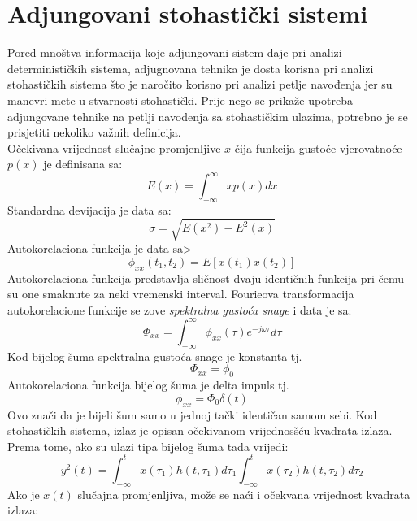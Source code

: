 \section{Adjungovani stohastički sistemi}
Pored mnoštva informacija koje adjungovani sistem daje pri analizi determinističkih 
sistema, adjugnovana tehnika je dosta korisna pri analizi stohastičkih sistema što je 
naročito korisno pri analizi petlje navođenja jer su manevri mete u stvarnosti stohastički. 
Prije nego se prikaže upotreba adjungovane tehnike na petlji navođenja sa stohastičkim 
ulazima, potrebno je se prisjetiti nekoliko važnih definicija.\\
Očekivana vrijednost slučajne promjenljive $x$ čija funkcija gustoće vjerovatnoće $p(x)$ je definisana sa:
\begin{equation}
    E(x)=\int_{-\infty}^{\infty}xp(x)dx
\end{equation}
Standardna devijacija je data sa:
\begin{equation}
    \sigma = \sqrt{E(x^2)-E^2(x)}
\end{equation}
Autokorelaciona funkcija je data sa>
\begin{equation}
    \phi_{xx}(t_1,t_2)=E[x(t_1)x(t_2)]
\end{equation}
Autokorelaciona funkcija predstavlja sličnost dvaju identičnih funkcija 
pri čemu su one smaknute za neki vremenski interval.
Fourieova transformacija autokorelacione funkcije se zove \textit{spektralna 
gustoća snage} i data je sa:
\begin{equation}
    \Phi_{xx}=\int_{-\infty}^{\infty}\phi_{xx}(\tau)e^{-j\omega\tau}d\tau
\end{equation}
Kod bijelog šuma spektralna gustoća snage je konstanta tj.
\begin{equation}
    \Phi_{xx}=\phi_{0}
\end{equation}
Autokorelaciona funkcija bijelog šuma je delta impuls tj. 
\begin{equation}
    \phi_{xx}=\Phi_{0}\delta(t)
\end{equation}
Ovo znači da je bijeli šum samo u jednoj tački identičan samom sebi. 
Kod stohastičkih sistema, izlaz je opisan očekivanom vrijednosšću kvadrata izlaza. 
Prema tome, ako su ulazi tipa bijelog šuma tada vrijedi:
\begin{equation}
    y^2(t)=\int_{-\infty}^tx(\tau_1)h(t,\tau_1)d\tau_1\int_{-\infty}^tx(\tau_2)h(t,\tau_2)d\tau_2
\end{equation}
Ako je $x(t)$ slučajna promjenljiva, može se naći i očekvana vrijednost kvadrata izlaza:

